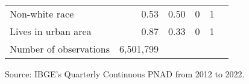 \begin{table}[H]
{\begin{tabular}{l*{5}{r}}
Non-white race      &        0.53&        0.50&           0&           1\\
Lives in urban area &        0.87&        0.33&           0&           1\\
\hline
Number of observations&   6,501,799&            &            &            \\
\hline \hline
\end{tabular}
\begin{tablenotes}
\item \scriptsize{Source: IBGE's Quarterly Continuous PNAD from 2012 to 2022.}
\end{tablenotes}
}
\end{table}

